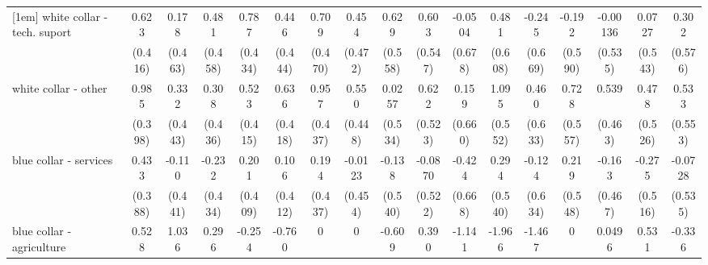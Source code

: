 {\begin{tabular}{l*{16}{c}}
[1em]
white collar - tech. suport&       0.623         &       0.178         &       0.481         &       0.787         &       0.446         &       0.709         &       0.454         &       0.629         &       0.603         &     -0.0504         &       0.481         &      -0.245         &      -0.192         &    -0.00136         &      0.0727         &       0.302         \\
                    &     (0.416)         &     (0.463)         &     (0.458)         &     (0.434)         &     (0.444)         &     (0.470)         &     (0.472)         &     (0.558)         &     (0.547)         &     (0.678)         &     (0.608)         &     (0.669)         &     (0.590)         &     (0.535)         &     (0.543)         &     (0.576)         \\
[1em]
white collar - other&       0.985\sym{*}  &       0.332         &       0.308         &       0.523         &       0.636         &       0.957\sym{*}  &       0.550         &      0.0257         &       0.622         &       0.159         &       1.095\sym{*}  &       0.460         &       0.728         &       0.539         &       0.478         &       0.533         \\
                    &     (0.398)         &     (0.443)         &     (0.436)         &     (0.415)         &     (0.418)         &     (0.437)         &     (0.448)         &     (0.534)         &     (0.523)         &     (0.660)         &     (0.552)         &     (0.633)         &     (0.557)         &     (0.463)         &     (0.526)         &     (0.553)         \\
[1em]
blue collar - services&       0.433         &      -0.110         &      -0.232         &       0.201         &       0.106         &       0.194         &     -0.0123         &      -0.138         &     -0.0870         &      -0.424         &       0.294         &      -0.124         &       0.219         &      -0.163         &      -0.275         &     -0.0728         \\
                    &     (0.388)         &     (0.441)         &     (0.434)         &     (0.409)         &     (0.412)         &     (0.437)         &     (0.454)         &     (0.540)         &     (0.522)         &     (0.668)         &     (0.540)         &     (0.634)         &     (0.548)         &     (0.467)         &     (0.516)         &     (0.535)         \\
[1em]
blue collar - agriculture&       0.528         &       1.036         &       0.296         &      -0.254         &      -0.760         &           0         &           0         &      -0.609         &       0.390         &      -1.141         &      -1.966         &      -1.467         &           0         &      0.0496         &       0.531         &      -0.336         \\

\end{tabular}}
